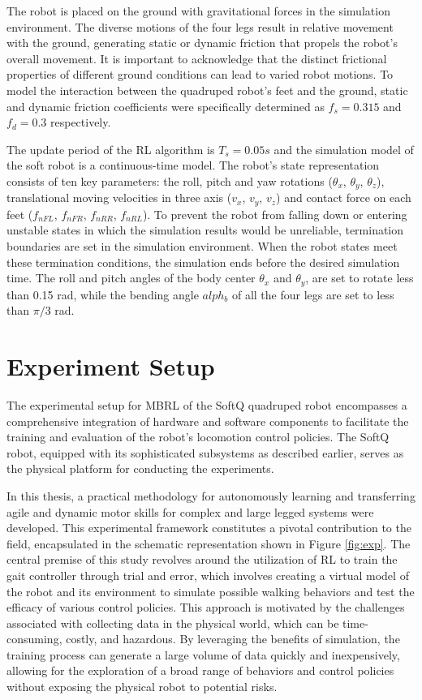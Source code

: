 The robot is placed on the ground with gravitational forces in the simulation environment. The diverse motions of the four legs result in relative movement with the ground, generating static or dynamic friction that propels the robot's overall movement. It is important to acknowledge that the distinct frictional properties of different ground conditions can lead to varied robot motions. To model the interaction between the quadruped robot's feet and the ground, static and dynamic friction coefficients were specifically determined as $f_s = 0.315$ and $f_d = 0.3$ respectively.

The update period of the RL algorithm is $T_s = 0.05s$ and the simulation model of the soft robot is a continuous-time model. The robot's state representation consists of ten key parameters: the roll, pitch and yaw rotations ($\theta_x$, $\theta_y$, $\theta_z$), translational moving velocities in three axis ($v_x$, $v_y$, $v_z$) and contact force on each feet ($f_{nFL}$, $f_{nFR}$, $f_{nRR}$, $f_{nRL}$). To prevent the robot from falling down or entering unstable states in which the simulation results would be unreliable, termination boundaries are set in the simulation environment. When the robot states meet these termination conditions, the simulation ends before the desired simulation time. The roll and pitch angles of the body center $\theta_x$ and $\theta_y$, are set to rotate less than 0.15 rad, while the bending angle $alph_b$ of all the four legs are set to less than $\pi/3$ rad. 

\section{Experiment Setup}
The experimental setup for MBRL of the SoftQ quadruped robot encompasses a comprehensive integration of hardware and software components to facilitate the training and evaluation of the robot's locomotion control policies. The SoftQ robot, equipped with its sophisticated subsystems as described earlier, serves as the physical platform for conducting the experiments. 



In this thesis, a practical methodology for autonomously learning and transferring agile and dynamic motor skills for complex and large legged systems were developed. This experimental framework constitutes a pivotal contribution to the field, encapsulated in the schematic representation shown in Figure \ref{fig:exp}. The central premise of this study revolves around the utilization of \ac{RL} to train the gait controller through trial and error, which involves creating a virtual model of the robot and its environment to simulate possible walking behaviors and test the efficacy of various control policies. This approach is motivated by the challenges associated with collecting data in the physical world, which can be time-consuming, costly, and hazardous. By leveraging the benefits of simulation, the training process can generate a large volume of data quickly and inexpensively, allowing for the exploration of a broad range of behaviors and control policies without exposing the physical robot to potential risks.


